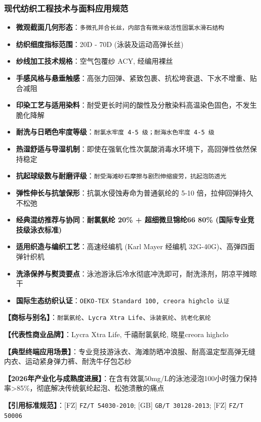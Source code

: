 \documentclass[11pt,openright,twoside,UTF8]{ctexbook}
\begin{document}
\subsubsection*{现代纺织工程技术与面料应用规范}
\begin{itemize} \setlength{\itemsep}{2pt}
    \item \textbf{微观截面几何形态}：\texttt{多微孔并合长丝，内部含有微米级活性固氯水滑石结构}
    \item \textbf{纺织细度指标范围}：20D - 70D (泳装及运动高弹长丝)
    \item \textbf{纱线加工技术规格}：空气包覆纱 ACY, 经编用裸丝
    \item \textbf{手感风格与悬垂触感}：高张力回弹、紧致包裹、抗松垮衰退、下水不增重、贴合减阻
    \item \textbf{印染工艺与适用染料}：耐受更长时间的酸性及分散染料高温染色固色，不发生脆化降解
    \item \textbf{耐洗与日晒色牢度等级}：\texttt{耐氯水牢度 4-5 级；耐海水色牢度 4-5 级}
    \item \textbf{热湿舒适与导湿机制}：即使在强氧化性次氯酸消毒水环境下，高回弹性依然保持稳定
    \item \textbf{抗起球级数与耐磨评级}：\texttt{耐受海滩砂石摩擦与剧烈伸缩疲劳，抗起泡防透光}
    \item \textbf{弹性伸长与抗皱保形}：抗氯水侵蚀寿命为普通氨纶的 5-10 倍，拉伸回弹持久不松弛
    \item \textbf{经典混纺推荐与协同}：\textbf{耐氯氨纶 20\% + 超细微旦锦纶66 80\% (国际专业竞技级泳衣标准)}
    \item \textbf{适用织造与编织工艺}：高速经编机 (Karl Mayer 经编机 32G-40G)、高弹四面弹针织机
    \item \textbf{洗涤保养与熨烫要点}：泳池游泳后冷水彻底冲洗即可，耐洗涤剂，阴凉平摊晾干
    \item \textbf{国际生态纺织认证}：\texttt{OEKO-TEX Standard 100, creora highclo 认证}
\end{itemize}
\vspace{0.2cm}

\noindent\textbf{【商标与别名】}：\texttt{耐氯氨纶}、\texttt{Lycra Xtra Life}、\texttt{泳装氨纶}、\texttt{抗老化氨纶}\par
\noindent\textbf{【代表性商业品牌】}：Lycra Xtra Life, 千禧耐氯氨纶, 晓星creora highclo\par
\noindent\textbf{【典型终端应用场景】}：专业竞技游泳衣、海滩防晒冲浪服、耐高温定型高弹无缝内衣、运动紧身弹力裤、耐洗牛仔包芯纱\par
\noindent\textbf{【2026年产业化与成熟度进展】}：在含有效氯50mg/L的泳池浸泡100小时强力保持率\textgreater{}85\%，彻底解决传统氨纶起泡、松弛溃散的痛点\par
\noindent\textbf{【引用标准规范】}：[FZ] \texttt{FZ/T 54030-2010}; [GB] \texttt{GB/T 30128-2013}; [FZ] \texttt{FZ/T 50006}\par
\vspace{0.5cm}
\end{document}
